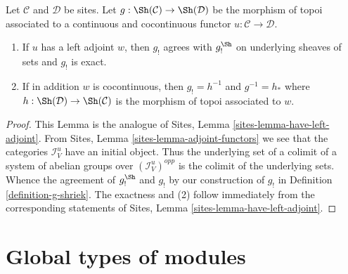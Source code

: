 \begin{lemma}
\label{lemma-have-left-adjoint}
Let $\mathcal{C}$ and $\mathcal{D}$ be sites. Let
$g : \Sh(\mathcal{C}) \to \Sh(\mathcal{D})$ be the morphism of topoi
associated to a continuous and cocontinuous functor
$u : \mathcal{C} \to \mathcal{D}$.
\begin{enumerate}
\item If $u$ has a left adjoint $w$, then $g_!$ agrees with $g_!^{\Sh}$
on underlying sheaves of sets and $g_!$ is exact.
\item If in addition $w$ is cocontinuous, then $g_! = h^{-1}$ and
$g^{-1} = h_*$ where
$h : \Sh(\mathcal{D}) \to \Sh(\mathcal{C})$ is the morphism of topoi
associated to $w$.
\end{enumerate}
\end{lemma}

\begin{proof}
This Lemma is the analogue of
Sites, Lemma \ref{sites-lemma-have-left-adjoint}.
From Sites, Lemma \ref{sites-lemma-adjoint-functors} we see that the categories
$\mathcal{I}_V^u$ have an initial object. Thus the underlying set of a
colimit of a system of abelian groups over $(\mathcal{I}_V^u)^{opp}$
is the colimit of the underlying sets. Whence the agreement
of $g_!^{\Sh}$ and $g_!$ by our construction of $g_!$ in
Definition \ref{definition-g-shriek}.
The exactness and (2) follow immediately from the corresponding statements of
Sites, Lemma \ref{sites-lemma-have-left-adjoint}.
\end{proof}





\section{Global types of modules}
\label{section-global}

